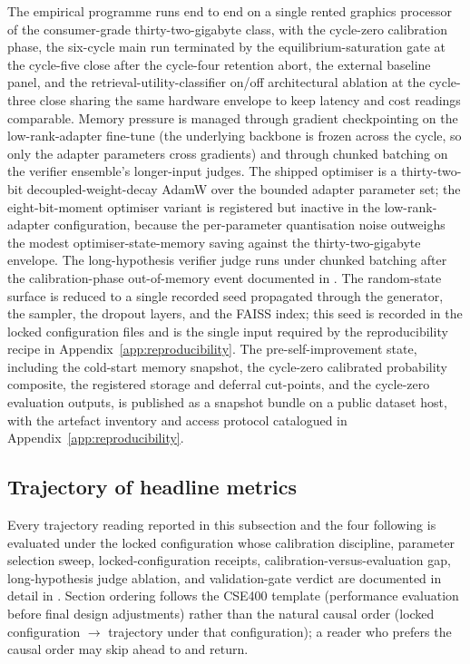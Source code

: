 The empirical programme runs end to end on a single rented graphics processor of the consumer-grade thirty-two-gigabyte class, with the cycle-zero calibration phase, the six-cycle main run terminated by the equilibrium-saturation gate at the cycle-five close after the cycle-four retention abort, the external baseline panel, and the retrieval-utility-classifier on/off architectural ablation at the cycle-three close sharing the same hardware envelope to keep latency and cost readings comparable. Memory pressure is managed through gradient checkpointing on the low-rank-adapter fine-tune (the underlying backbone is frozen across the cycle, so only the adapter parameters cross gradients) and through chunked batching on the verifier ensemble's longer-input judges. The shipped optimiser is a thirty-two-bit decoupled-weight-decay AdamW over the bounded adapter parameter set; the eight-bit-moment optimiser variant is registered but inactive in the low-rank-adapter configuration, because the per-parameter quantisation noise outweighs the modest optimiser-state-memory saving against the thirty-two-gigabyte envelope. The long-hypothesis verifier judge runs under chunked batching after the calibration-phase out-of-memory event documented in . The random-state surface is reduced to a single recorded seed propagated through the generator, the sampler, the dropout layers, and the FAISS index; this seed is recorded in the locked configuration files and is the single input required by the reproducibility recipe in Appendix~\ref{app:reproducibility}. The pre-self-improvement state, including the cold-start memory snapshot, the cycle-zero calibrated probability composite, the registered storage and deferral cut-points, and the cycle-zero evaluation outputs, is published as a snapshot bundle on a public dataset host, with the artefact inventory and access protocol catalogued in Appendix~\ref{app:reproducibility}.

\subsection{Trajectory of headline metrics}
\label{sec:headline-trajectory}

Every trajectory reading reported in this subsection and the four following is evaluated under the locked configuration whose calibration discipline, parameter selection sweep, locked-configuration receipts, calibration-versus-evaluation gap, long-hypothesis judge ablation, and validation-gate verdict are documented in detail in . Section ordering follows the CSE400 template (performance evaluation before final design adjustments) rather than the natural causal order (locked configuration $\rightarrow$ trajectory under that configuration); a reader who prefers the causal order may skip ahead to  and return.

